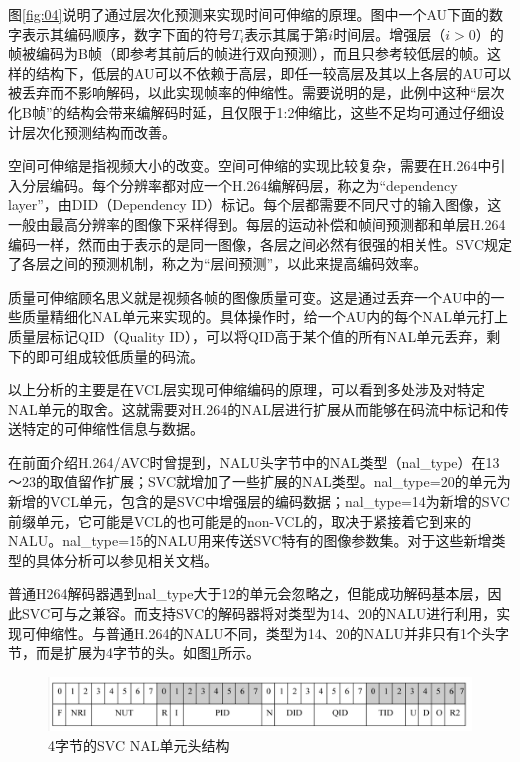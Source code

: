 图\ref{fig:04}\supercite{SVC-Overview}说明了通过层次化预测来实现时间可伸缩的原理。图中一个AU下面的数字表示其编码顺序，数字下面的符号$T_i$表示其属于第$i$时间层。增强层（$i>0$）的帧被编码为B帧（即参考其前后的帧进行双向预测），而且只参考较低层的帧。这样的结构下，低层的AU可以不依赖于高层，即任一较高层及其以上各层的AU可以被丢弃而不影响解码，以此实现帧率的伸缩性。需要说明的是，此例中这种“层次化B帧”的结构会带来编解码时延，且仅限于1:2伸缩比，这些不足均可通过仔细设计层次化预测结构而改善。

空间可伸缩是指视频大小的改变。空间可伸缩的实现比较复杂，需要在H.264中引入分层编码。每个分辨率都对应一个H.264编解码层，称之为“dependency layer”，由DID（Dependency ID）标记。每个层都需要不同尺寸的输入图像，这一般由最高分辨率的图像下采样得到。每层的运动补偿和帧间预测都和单层H.264编码一样，然而由于表示的是同一图像，各层之间必然有很强的相关性。SVC规定了各层之间的预测机制，称之为“层间预测”，以此来提高编码效率。

质量可伸缩顾名思义就是视频各帧的图像质量可变。这是通过丢弃一个AU中的一些质量精细化NAL单元来实现的。具体操作时，给一个AU内的每个NAL单元打上质量层标记QID（Quality ID），可以将QID高于某个值的所有NAL单元丢弃，剩下的即可组成较低质量的码流。

以上分析的主要是在VCL层实现可伸缩编码的原理，可以看到多处涉及对特定NAL单元的取舍。这就需要对H.264的NAL层进行扩展从而能够在码流中标记和传送特定的可伸缩性信息与数据。

在前面介绍H.264/AVC时曾提到，NALU头字节中的NAL类型（nal\_type）在13～23的取值留作扩展；SVC就增加了一些扩展的NAL类型。nal\_type=20的单元为新增的VCL单元，包含的是SVC中增强层的编码数据；nal\_type=14为新增的SVC前缀单元，它可能是VCL的也可能是的non-VCL的，取决于紧接着它到来的NALU。nal\_type=15的NALU用来传送SVC特有的图像参数集。对于这些新增类型的具体分析可以参见相关文档\supercite{SVC-Interface}。

普通H264解码器遇到nal\_type大于12的单元会忽略之，但能成功解码基本层，因此SVC可与之兼容。而支持SVC的解码器将对类型为14、20的NALU进行利用，实现可伸缩性。与普通H.264的NALU不同，类型为14、20的NALU并非只有1个头字节，而是扩展为4字节的头。如图\ref{fig:05}\supercite{SVC-Interface}所示。

\begin{figure}[h]
	\centering
	\includegraphics[width = 1.0\linewidth]{clip/05.png}
	\caption{4字节的SVC NAL单元头结构\label{fig:05}}
\end{figure}

